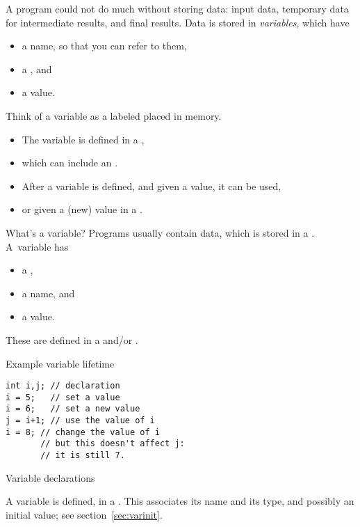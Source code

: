 A program could not do much without storing data: input data,
temporary data for intermediate results, and final results.
Data is stored in \emph{variables},  which have
\begin{itemize}
\item a name, so that you can refer to them,
\item a , and
\item a value.
\end{itemize}
Think of a variable as a labeled placed in memory.
\begin{itemize}
\item The variable is defined in a
  ,
\item which can include an .
\item After a variable is defined, and given a value, it can be used,
\item or given a (new) value in a .
\end{itemize}

\begin{slide}{What's a variable?}
  \label{sl:declaration}
  Programs usually contain data, which is stored in a
  . A~variable has
  \begin{itemize}
  \item a ,
  \item a name, and
  \item a value.
  \end{itemize}
  These are defined in a  and/or
  .
\end{slide}

\begin{block}{Example variable lifetime}
  \label{sl:varlife}
\begin{lstlisting}
int i,j; // declaration
i = 5;   // set a value
i = 6;   // set a new value
j = i+1; // use the value of i
i = 8; // change the value of i
       // but this doesn't affect j:
       // it is still 7.
\end{lstlisting}
\end{block}

 {Variable declarations}

A variable is defined,
in a .
This associates its name and its type,
and possibly an initial value; see section~\ref{sec:varinit}.

